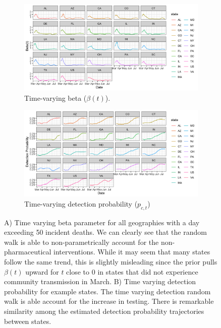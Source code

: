 \documentclass[11pt]{amsart}
\begin{document}
\begin{figure}
  \centering
     \begin{subfigure}{1\textwidth}
  \centering
    \includegraphics[scale=.2]{beta_t_plot.png}
    \caption{Time-varying beta ($\beta(t)$).}
\end{subfigure}

\begin{subfigure}{1\textwidth}
  \centering
    \includegraphics[scale=.2]{detection_plot.png}
    \caption{Time-varying detection probability ($p_{c,t}$)}
\end{subfigure} 
 \caption{  A) Time varying beta parameter for all geographies with a day exceeding 50 incident deaths. We can clearly see that the random walk is able to non-parametrically account for the non-pharmaceutical interventions. While it may seem that many states follow the same trend, this is slightly misleading since the prior pulls $\beta(t)$ upward for $t$ close to 0 in states that did not experience community transmission in March.  B) Time varying detection probability for example states. The time varying detection random walk is able account for the increase in testing. There is remarkable similarity among the estimated detection probability trajectories between states.}
\label{fig:model_details}
\end{figure}
\end{document}
